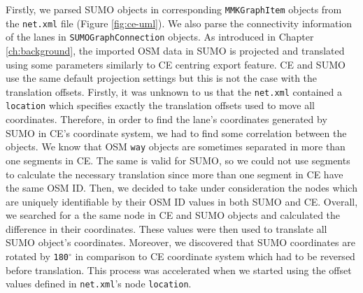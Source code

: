 Firstly, we parsed SUMO objects in corresponding \texttt{MMKGraphItem} objects from the \texttt{net.xml} file (Figure \ref{fig:ce-uml}). We also parse the connectivity information of the lanes in \texttt{SUMOGraphConnection} objects. As introduced in Chapter \ref{ch:background}, the imported OSM data in SUMO is projected and translated using some parameters similarly to CE centring export feature. CE and SUMO use the same default projection settings but this is not the case with the translation offsets. Firstly, it was unknown to us that the \texttt{net.xml} contained a \texttt{location} which specifies exactly the translation offsets used to move all coordinates. Therefore, in order to find the lane's coordinates generated by SUMO in CE's coordinate system, we had to find some correlation between the objects. We know that OSM \texttt{way} objects are sometimes separated in more than one segments in CE. The same is valid for SUMO, so we could not use segments to calculate the necessary translation since more than one segment in CE have the same OSM ID. Then, we decided to take under consideration the nodes which are uniquely identifiable by their OSM ID values in both SUMO and CE. Overall, we searched for a the same node in CE and SUMO objects and calculated the difference in their coordinates. These values were then used to translate all SUMO object's coordinates. Moreover, we discovered that SUMO coordinates are rotated by \texttt{180$^{\circ}$} in comparison to CE coordinate system which had to be reversed before translation. This process was accelerated when we started using the offset values defined in \texttt{net.xml}'s node \texttt{location}.

